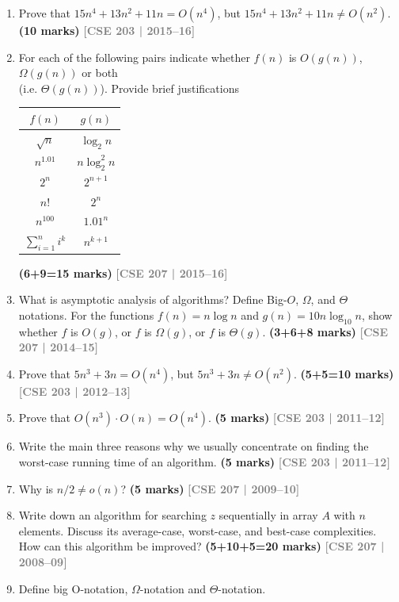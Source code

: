 \documentclass[12pt,a3paper]{article}
\newcommand{\yr}[1]{\hfill\textcolor{gray}{\small\textbf{[#1]}}}
\newcommand{\mk}[1]{\textcolor{orange!70!black}{\small\textbf{(#1 marks)}}}
\begin{document}
\begin{enumerate}
\item Prove that $15n^4 + 13n^2 + 11n = O(n^4)$, but $15n^4 + 13n^2 + 11n \neq O(n^2)$. \mk{10}
\yr{CSE 203 | 2015--16}

\item  For each of the following pairs indicate whether $f(n)$ is $O(g(n))$, $\Omega(g(n))$ or both \\
(i.e. $\Theta(g(n))$). Provide brief justifications
\begin{center}
\begin{tabular}{|c|c|}
\hline
$f(n)$ & $g(n)$ \\
\hline
$\sqrt{n}$ & $\log_2 n$ \\
\hline
$n^{1.01}$ & $n \log_2^2 n$ \\
\hline
$2^n$ & $2^{n+1}$ \\
\hline
$n!$ & $2^n$ \\
\hline
$n^{100}$ & $1.01^n$ \\
\hline
$\sum_{i=1}^{n} i^k$ & $n^{k+1}$ \\
\hline
\end{tabular}
\end{center}
\mk{6+9=15}
\yr{CSE 207 | 2015--16}

\item What is asymptotic analysis of algorithms? Define Big-$O$, $\Omega$, and $\Theta$ notations. For the functions $f(n) = n\log n$ and $g(n) = 10n\log_{10} n$, show whether $f$ is $O(g)$, or $f$ is $\Omega(g)$, or $f$ is $\Theta(g)$. \mk{3+6+8}
\yr{CSE 207 | 2014--15}

\item Prove that $5n^3 + 3n = O(n^4)$, but $5n^3 + 3n \neq O(n^2)$. \mk{5+5=10}
\yr{CSE 203 | 2012--13}

\item Prove that $O(n^3) \cdot O(n) = O(n^4)$. \mk{5}
\yr{CSE 203 | 2011--12}

\item Write the main three reasons why we usually concentrate on finding the worst-case running time of an algorithm. \mk{5}
\yr{CSE 203 | 2011--12}

\item Why is $n/2 \neq o(n)$? \mk{5}
\yr{CSE 207 | 2009--10}

\item Write down an algorithm for searching $z$ sequentially in array $A$ with $n$ elements. Discuss its average-case, worst-case, and best-case complexities. How can this algorithm be improved? \mk{5+10+5=20}
\yr{CSE 207 | 2008--09}

\item  Define big O-notation, $\Omega$-notation and $\Theta$-notation.

\end{enumerate}
\newpage
\end{document}

